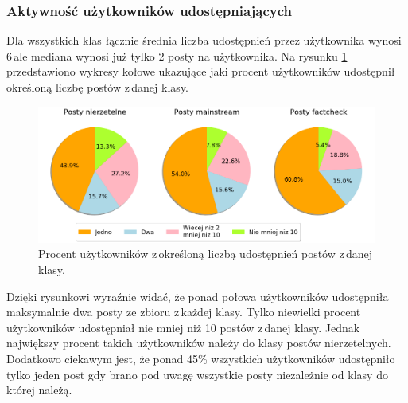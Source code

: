 \subsubsection{Aktywność użytkowników udostępniających}
Dla wszystkich klas łącznie średnia liczba udostępnień przez użytkownika wynosi 6\,ale mediana wynosi już tylko 2 posty na użytkownika. Na rysunku \ref{fig:retweets-per-user} przedstawiono wykresy kołowe ukazujące jaki procent użytkowników udostępnił określoną liczbę postów z\,danej klasy. 
\begin{figure}[!h]
	\centering \includegraphics[width=0.9\linewidth]{img/results/retweetsperuser.png}
	\caption{Procent użytkowników z\,określoną liczbą udostępnień postów z\,danej klasy.} \label{fig:retweets-per-user}
\end{figure}

\par
Dzięki rysunkowi wyraźnie widać, że ponad połowa użytkowników udostępniła maksymalnie dwa posty ze zbioru z\,każdej klasy. Tylko niewielki procent użytkowników udostępniał nie mniej niż 10 postów z\,danej klasy. Jednak największy procent takich użytkowników należy do klasy postów nierzetelnych. Dodatkowo ciekawym jest, że ponad 45\% wszystkich użytkowników udostępniło tylko jeden post gdy brano pod uwagę wszystkie posty niezależnie od klasy do której należą.

